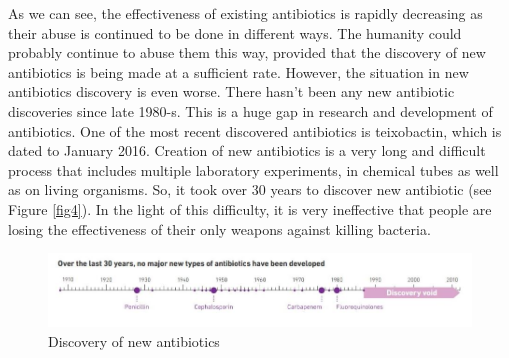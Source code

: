 As we can see, the effectiveness of existing antibiotics is rapidly decreasing as their abuse is continued to be done in different ways. The humanity could probably continue to abuse them this way, provided that the discovery of new antibiotics is being made at a sufficient rate. However, the situation in new antibiotics discovery is even worse. There hasn't been any new antibiotic discoveries since late 1980-s. This is a huge gap in research and development of antibiotics. One of the most recent discovered antibiotics is teixobactin, which is dated to January 2016. Creation of new antibiotics is a very long and difficult process that includes multiple laboratory experiments, in chemical tubes as well as on living organisms. So, it took over 30 years to discover new antibiotic (see Figure \ref{fig4}). In the light of this difficulty, it is very ineffective that people are losing the effectiveness of their only weapons against killing bacteria.

\begin{figure}[H]
  \centering
  \includegraphics[width=\textwidth]{img/Fig5}
  \caption{Discovery of new antibiotics}
  \label{fig5}
\end{figure}

